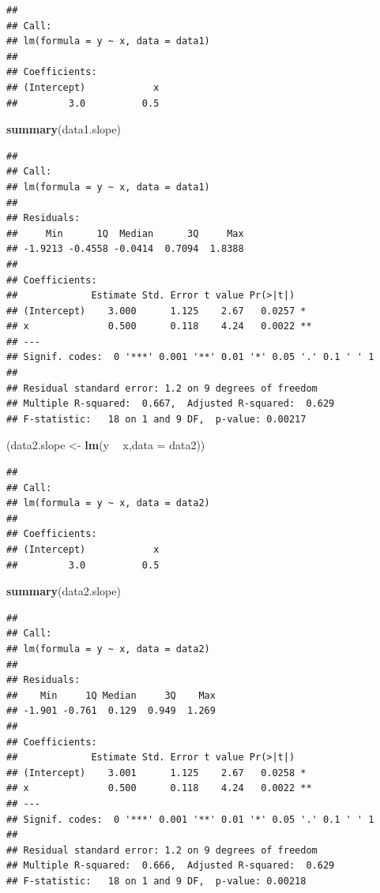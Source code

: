 \documentclass[]{article}
\newenvironment{Shaded}{\begin{snugshade}}{\end{snugshade}}
\newcommand{\KeywordTok}[1]{\textcolor[rgb]{0.13,0.29,0.53}{\textbf{#1}}}
\newcommand{\DataTypeTok}[1]{\textcolor[rgb]{0.13,0.29,0.53}{#1}}
\newcommand{\StringTok}[1]{\textcolor[rgb]{0.31,0.60,0.02}{#1}}
\newcommand{\OperatorTok}[1]{\textcolor[rgb]{0.81,0.36,0.00}{\textbf{#1}}}
\newcommand{\NormalTok}[1]{#1}
\begin{document}
\begin{verbatim}
## 
## Call:
## lm(formula = y ~ x, data = data1)
## 
## Coefficients:
## (Intercept)            x  
##         3.0          0.5
\end{verbatim}

\begin{Shaded}
\begin{Highlighting}[]
\KeywordTok{summary}\NormalTok{(data1.slope)}
\end{Highlighting}
\end{Shaded}

\begin{verbatim}
## 
## Call:
## lm(formula = y ~ x, data = data1)
## 
## Residuals:
##     Min      1Q  Median      3Q     Max 
## -1.9213 -0.4558 -0.0414  0.7094  1.8388 
## 
## Coefficients:
##             Estimate Std. Error t value Pr(>|t|)   
## (Intercept)    3.000      1.125    2.67   0.0257 * 
## x              0.500      0.118    4.24   0.0022 **
## ---
## Signif. codes:  0 '***' 0.001 '**' 0.01 '*' 0.05 '.' 0.1 ' ' 1
## 
## Residual standard error: 1.2 on 9 degrees of freedom
## Multiple R-squared:  0.667,  Adjusted R-squared:  0.629 
## F-statistic:   18 on 1 and 9 DF,  p-value: 0.00217
\end{verbatim}

\begin{Shaded}
\begin{Highlighting}[]
\NormalTok{(data2.slope <-}\StringTok{ }\KeywordTok{lm}\NormalTok{(y }\OperatorTok{~}\StringTok{ }\NormalTok{x,}\DataTypeTok{data =}\NormalTok{ data2))}
\end{Highlighting}
\end{Shaded}

\begin{verbatim}
## 
## Call:
## lm(formula = y ~ x, data = data2)
## 
## Coefficients:
## (Intercept)            x  
##         3.0          0.5
\end{verbatim}

\begin{Shaded}
\begin{Highlighting}[]
\KeywordTok{summary}\NormalTok{(data2.slope)}
\end{Highlighting}
\end{Shaded}

\begin{verbatim}
## 
## Call:
## lm(formula = y ~ x, data = data2)
## 
## Residuals:
##    Min     1Q Median     3Q    Max 
## -1.901 -0.761  0.129  0.949  1.269 
## 
## Coefficients:
##             Estimate Std. Error t value Pr(>|t|)   
## (Intercept)    3.001      1.125    2.67   0.0258 * 
## x              0.500      0.118    4.24   0.0022 **
## ---
## Signif. codes:  0 '***' 0.001 '**' 0.01 '*' 0.05 '.' 0.1 ' ' 1
## 
## Residual standard error: 1.2 on 9 degrees of freedom
## Multiple R-squared:  0.666,  Adjusted R-squared:  0.629 
## F-statistic:   18 on 1 and 9 DF,  p-value: 0.00218
\end{verbatim}
\end{document}
